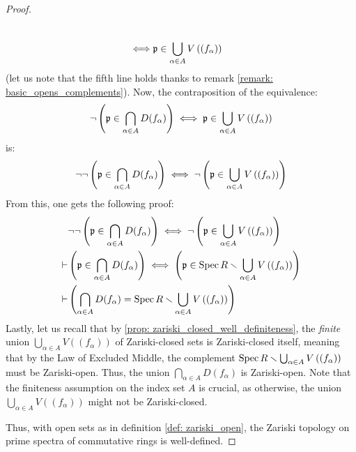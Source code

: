 \begin{proof}
\begin{enumerate}
$$\begin{aligned}
                                        \\
                                        \iff & \mathfrak{p} \in \bigcup_{\alpha \in A} V\left((f_{\alpha})\right)
                                    \end{aligned}
                                $$
                            (let us note that the fifth line holds thanks to remark \ref{remark: basic_opens_complements}). Now, the contraposition of the equivalence:
                                $$\neg \left(\mathfrak{p} \in \bigcap_{\alpha \in A} D(f_{\alpha})\right) \iff \mathfrak{p} \in \bigcup_{\alpha \in A} V\left((f_{\alpha})\right)$$
                            is:
                                $$\neg \neg \left(\mathfrak{p} \in \bigcap_{\alpha \in A} D(f_{\alpha})\right) \iff \neg \left(\mathfrak{p} \in \bigcup_{\alpha \in A} V\left((f_{\alpha})\right) \right)$$
                            From this, one gets the following proof:
                                $$
                                    \begin{aligned}
                                        & \neg \neg \left(\mathfrak{p} \in \bigcap_{\alpha \in A} D(f_{\alpha})\right) \iff \neg \left(\mathfrak{p} \in \bigcup_{\alpha \in A} V\left((f_{\alpha})\right) \right)
                                        \\
                                        \vdash & \left(\mathfrak{p} \in \bigcap_{\alpha \in A} D(f_{\alpha})\right) \iff \left(\mathfrak{p} \in \operatorname{Spec} R \smallsetminus \bigcup_{\alpha \in A} V\left((f_{\alpha})\right) \right) 
                                        \\
                                        \vdash & \left(\bigcap_{\alpha \in A} D(f_{\alpha}) = \operatorname{Spec} R \smallsetminus \bigcup_{\alpha \in A} V\left((f_{\alpha})\right)\right)
                                    \end{aligned}
                                $$
                            Lastly, let us recall that by \ref{prop: zariski_closed_well_definiteness}, the \textit{finite} union $\bigcup_{\alpha \in A} V\left((f_{\alpha})\right)$ of Zariski-closed sets is Zariski-closed itself, meaning that by the Law of Excluded Middle, the complement $\operatorname{Spec} R \smallsetminus \bigcup_{\alpha \in A} V\left((f_{\alpha})\right)$ must be Zariski-open. Thus, the union $\bigcap_{\alpha \in A} D(f_{\alpha})$ is Zariski-open. Note that the finiteness assumption on the index set $A$ is crucial, as otherwise, the union $\bigcup_{\alpha \in A} V\left((f_{\alpha})\right)$ might not be Zariski-closed.
                        \end{enumerate}
                    Thus, with open sets as in definition \ref{def: zariski_open}, the Zariski topology on prime spectra of commutative rings is well-defined.
                \end{proof}

